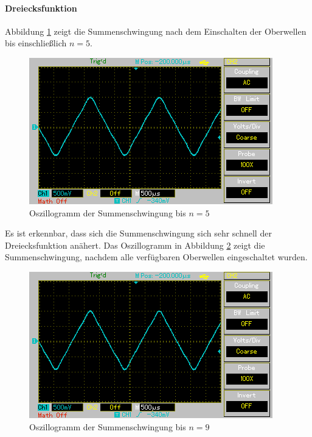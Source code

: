 \documentclass[11pt,ngerman,a4paper]{article}
\begin{document}
\paragraph{Dreiecksfunktion} 
Abbildung \ref{hut_1} zeigt die Summenschwingung nach dem Einschalten der Oberwellen bis einschlie\ss lich $ n = 5$. 
\begin{figure}[htp]
\centering
\includegraphics[scale=0.8]{Screenshots/hut_1.png}
\caption{Oszillogramm  der Summenschwingung bis $n = 5$}
\label{hut_1}
\end{figure}
Es ist erkennbar, dass sich die Summenschwingung sich sehr schnell der Dreiecksfunktion an\"ahert. Das Oszillogramm in Abbildung \ref{hut_2} zeigt die Summenschwingung, nachdem alle verf\"ugbaren Oberwellen eingeschaltet wurden.
\begin{figure}[htp]
\centering
\includegraphics[scale=0.8]{Screenshots/hut_2.png}
\caption{Oszillogramm  der Summenschwingung bis $n = 9$}
\label{hut_2}
\end{figure}
 
\end{document}
